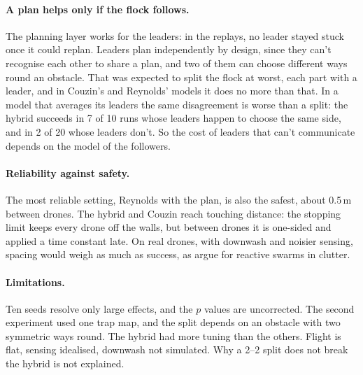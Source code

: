 \paragraph{A plan helps only if the flock follows.} The planning layer works
for the leaders: in the replays, no leader stayed stuck once it could replan.
Leaders plan independently by design, since they can't recognise each other
to share a plan, and two of them can choose different ways round an
obstacle. That was expected to split the flock at worst, each part with a
leader, and in Couzin's and Reynolds' models it does no more than that. In
a model that averages its leaders the same disagreement is worse than a
split: the hybrid succeeds in 7 of 10 runs whose leaders happen to choose the
same side, and in 2 of 20 whose leaders don't. So the cost of leaders that
can't communicate depends on the model of the followers.

\paragraph{Reliability against safety.} The most reliable setting,
Reynolds with the plan, is also the safest, about 0.5\,m between drones. The
hybrid and Couzin reach touching distance: the stopping limit keeps every
drone off the walls, but between drones it is one-sided and applied a time
constant late. On real drones, with downwash and noisier sensing, spacing
would weigh as much as success, as \citet{soria2021} argue for reactive swarms
in clutter.

\paragraph{Limitations.} Ten seeds resolve only large effects, and the $p$
values are uncorrected. The second experiment used one trap map, and the
split depends on an obstacle with two symmetric ways round. The hybrid had
more tuning than the others. Flight is flat, sensing idealised, downwash not
simulated. Why a 2--2 split does not break the hybrid is not explained.
